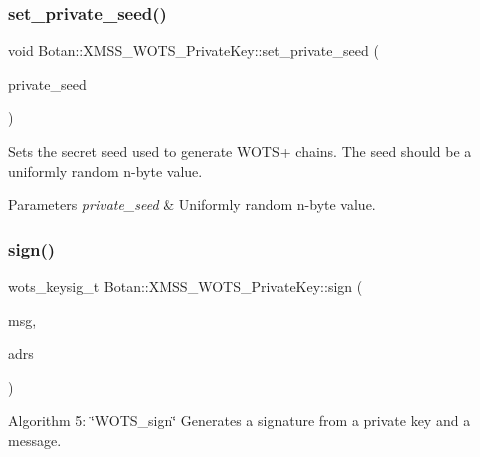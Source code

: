 \subsubsection{\texorpdfstring{set\+\_\+private\+\_\+seed()}{set\_private\_seed()}\hspace{0.1cm}{\footnotesize\ttfamily [2/2]}}
{\footnotesize\ttfamily void Botan\+::\+X\+M\+S\+S\+\_\+\+W\+O\+T\+S\+\_\+\+Private\+Key\+::set\+\_\+private\+\_\+seed (\begin{DoxyParamCaption}\item[{secure\+\_\+vector$<$ uint8\+\_\+t $>$ \&\&}]{private\+\_\+seed }\end{DoxyParamCaption})\hspace{0.3cm}{\ttfamily [inline]}}

Sets the secret seed used to generate W\+O\+T\+S+ chains. The seed should be a uniformly random n-\/byte value.


\begin{DoxyParams}{Parameters}
{\em private\+\_\+seed} & Uniformly random n-\/byte value. \\
\hline
\end{DoxyParams}
\mbox{\label{class_botan_1_1_x_m_s_s___w_o_t_s___private_key_a8a392d55b4494010566455cf12c37e6c}} 
\subsubsection{\texorpdfstring{sign()}{sign()}\hspace{0.1cm}{\footnotesize\ttfamily [1/2]}}
{\footnotesize\ttfamily wots\+\_\+keysig\+\_\+t Botan\+::\+X\+M\+S\+S\+\_\+\+W\+O\+T\+S\+\_\+\+Private\+Key\+::sign (\begin{DoxyParamCaption}\item[{const secure\+\_\+vector$<$ uint8\+\_\+t $>$ \&}]{msg,  }\item[{\hyperlink{class_botan_1_1_x_m_s_s___address}{X\+M\+S\+S\+\_\+\+Address} \&}]{adrs }\end{DoxyParamCaption})\hspace{0.3cm}{\ttfamily [inline]}}

Algorithm 5\+: \char`\"{}\+W\+O\+T\+S\+\_\+sign\char`\"{} Generates a signature from a private key and a message.


